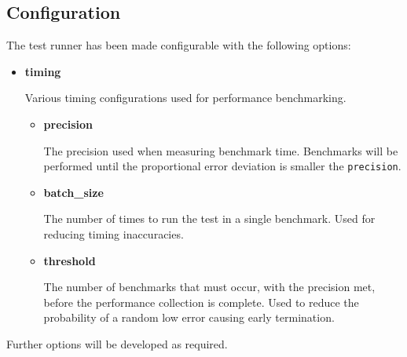 \subsection{Configuration}

The test runner has been made configurable with the following options:

\begin{itemize}
    \item \textbf{timing}
    
    Various timing configurations used for performance benchmarking.

    \begin{itemize}
        \item \textbf{precision}
        
        The precision used when measuring benchmark time. Benchmarks will be performed until the proportional error deviation is smaller the \texttt{precision}.

        \item \textbf{batch\_size}
        
        The number of times to run the test in a single benchmark. Used  for reducing timing inaccuracies.

        \item \textbf{threshold}
        
        The number of benchmarks that must occur, with the precision met, before the performance collection is complete. Used to reduce the probability of a random low error causing early termination.

    \end{itemize}
\end{itemize}

Further options will be developed as required.